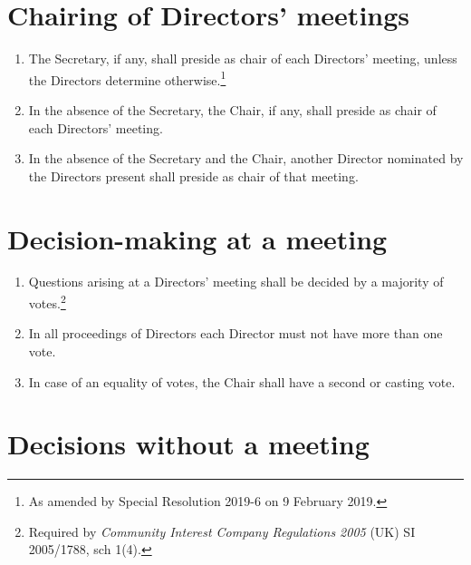\documentclass[a4paper,12pt]{article}
\begin{document}
\section{Chairing of Directors' meetings}

\begin{enumerate}
  \item The Secretary, if any, shall preside as chair of each Directors' meeting, unless the Directors determine otherwise.\footnote{\label{sr2019-6}As amended by Special Resolution 2019-6 on 9 February 2019.}
  \item In the absence of the Secretary, the Chair, if any, shall preside as chair of each Directors' meeting.\footnotemark[\ref{sr2019-6}]
  \item In the absence of the Secretary and the Chair, another Director nominated by the Directors present shall preside as chair of that meeting.\footnotemark[\ref{sr2019-6}]
\end{enumerate}

\section{Decision-making at a meeting}

\begin{enumerate}
  \item Questions arising at a Directors' meeting shall be decided by a majority of votes.\footnote{\label{meetingdecision1}Required by \textit{Community Interest Company Regulations 2005} (UK) SI 2005/1788, sch 1(4).}
  \item In all proceedings of Directors each Director must not have more than one vote.\footnotemark[\ref{meetingdecision1}]
  \item In case of an equality of votes, the Chair shall have a second or casting vote.\footnotemark[\ref{meetingdecision1}]
\end{enumerate}

\section{Decisions without a meeting}
\end{document}
